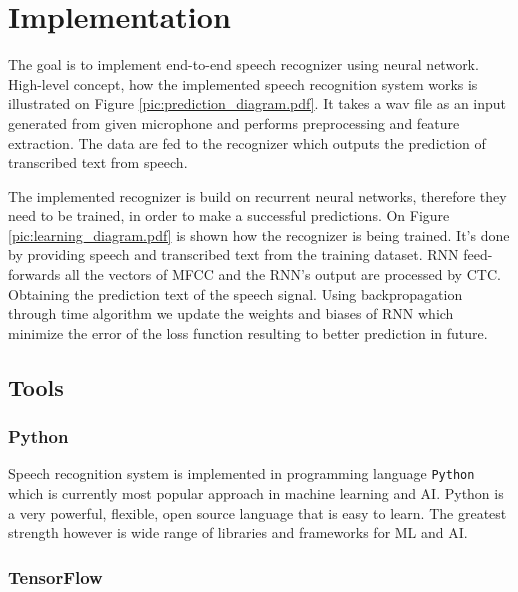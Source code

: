 \chapter{Implementation}

The goal is to implement end-to-end speech recognizer using neural network.
High-level concept, how the implemented speech recognition system works is illustrated on Figure \ref{pic:prediction_diagram.pdf}.
It takes a wav file as an input generated from given microphone and performs preprocessing and feature extraction.
The data are fed to the recognizer which outputs the prediction of transcribed text from speech.


The implemented recognizer is build on recurrent neural networks, therefore they need to be trained, in order to make a successful predictions.
On Figure \ref{pic:learning_diagram.pdf} is shown how the recognizer is being trained.
It's done by providing speech and transcribed text from the training dataset.
RNN feed-forwards all the vectors of MFCC and the RNN's output are processed by CTC. Obtaining the prediction text of the speech signal.
Using backpropagation through time algorithm we update the weights and biases of RNN which minimize the error of the loss function resulting to better prediction in future.



\section{Tools}

\subsection{Python}

Speech recognition system is implemented in programming language \texttt{Python} which is currently most popular approach in machine learning and AI.
Python is a very powerful, flexible, open source language that is easy to learn.
The greatest strength however is wide range of libraries and frameworks for ML and AI.

\subsection{TensorFlow}

